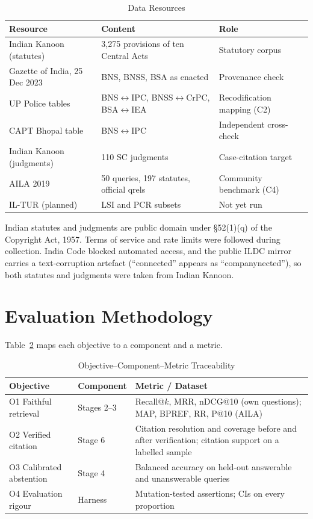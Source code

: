 \documentclass[conference]{IEEEtran}
\begin{document}
\begin{table}[t]
\caption{Data Resources}
\label{tab:data}
\centering
\footnotesize
\begin{tabular}{@{}p{1.9cm}p{2.5cm}p{2.8cm}@{}}
\toprule
\textbf{Resource} & \textbf{Content} & \textbf{Role} \\
\midrule
Indian Kanoon (statutes) & 3,275 provisions of ten Central Acts & Statutory corpus \\
\addlinespace
Gazette of India, 25 Dec 2023 & BNS, BNSS, BSA as enacted & Provenance check \\
\addlinespace
UP Police tables & BNS$\leftrightarrow$IPC, BNSS$\leftrightarrow$CrPC, BSA$\leftrightarrow$IEA & Recodification mapping (C2) \\
\addlinespace
CAPT Bhopal table & BNS$\leftrightarrow$IPC & Independent cross-check \\
\addlinespace
Indian Kanoon (judgments) & 110 SC judgments & Case-citation target \\
\addlinespace
AILA 2019 \cite{bhattacharya2019} & 50 queries, 197 statutes, official qrels & Community benchmark (C4) \\
\addlinespace
IL-TUR \cite{joshi2024} (planned) & LSI and PCR subsets & Not yet run \\
\bottomrule
\end{tabular}
\end{table}

Indian statutes and judgments are public domain under \S52(1)(q) of the Copyright Act, 1957. Terms of service and rate limits were followed during collection. India Code blocked automated access, and the public ILDC mirror carries a text-corruption artefact (``connected'' appears as ``companynected''), so both statutes and judgments were taken from Indian Kanoon.

\section{Evaluation Methodology}

Table~\ref{tab:trace} maps each objective to a component and a metric.

\begin{table}[t]
\caption{Objective--Component--Metric Traceability}
\label{tab:trace}
\centering
\footnotesize
\begin{tabular}{@{}p{1.5cm}p{2.3cm}p{3.4cm}@{}}
\toprule
\textbf{Objective} & \textbf{Component} & \textbf{Metric / Dataset} \\
\midrule
O1 Faithful retrieval & Stages 2--3 & Recall@$k$, MRR, nDCG@10 (own questions); MAP, BPREF, RR, P@10 (AILA) \\
\addlinespace
O2 Verified citation & Stage 6 & Citation resolution and coverage before and after verification; citation support on a labelled sample \\
\addlinespace
O3 Calibrated abstention & Stage 4 & Balanced accuracy on held-out answerable and unanswerable queries \\
\addlinespace
O4 Evaluation rigour & Harness & Mutation-tested assertions; CIs on every proportion \\
\bottomrule
\end{tabular}
\end{table}
\end{document}
